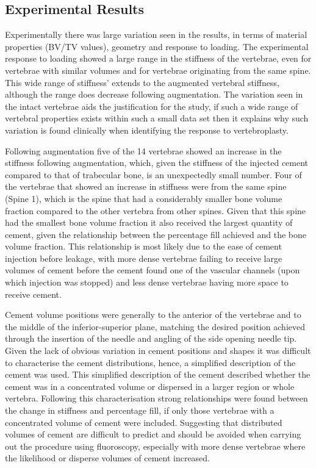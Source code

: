 \subsection{Experimental Results}

Experimentally there was large variation seen in the results, in terms of
material properties (BV/TV values), geometry and response to loading.  The
experimental response to loading showed a large range in the stiffness of the
vertebrae, even for vertebrae with similar volumes and for vertebrae
originating from the same spine.  This wide range of stiffness' extends to the
augmented vertebral stiffness, although the range does decrease following
augmentation.  The variation seen in the intact vertebrae aids the
justification for the study, if such a wide range of vertebral properties
exists within such a small data set then it explains why such variation is
found clinically when identifying the response to vertebroplasty.

Following augmentation five of the 14 vertebrae showed an increase in the
stiffness following augmentation, which, given the stiffness of the injected
cement compared to that of trabecular bone, is an unexpectedly small number.
Four of the vertebrae that showed an increase in stiffness were from the same
spine (Spine 1), which is the spine that had a considerably smaller bone volume
fraction compared to the other vertebra from other spines.  Given that this
spine had the smallest bone volume fraction it also received the largest
quantity of cement, given the relationship between the percentage fill achieved
and the bone volume fraction.  This relationship is most likely due to the ease
of cement injection before leakage, with more dense vertebrae failing to
receive large volumes of cement before the cement found one of the vascular
channels (upon which injection was stopped) and less dense vertebrae having
more space to receive cement.

Cement volume positions were generally to the anterior of the vertebrae and to
the middle of the inferior-superior plane, matching the desired position
achieved through the insertion of the needle and angling of the side opening
needle tip.  Given the lack of obvious variation in cement positions and shapes
it was difficult to characterise the cement distributions, hence, a simplified
description of the cement was used.  This simplified description of the cement
described whether the cement was in a concentrated volume or dispersed in a
larger region or whole vertebra.  Following this characterisation strong
relationships were found between the change in stiffness and percentage fill,
if only those vertebrae with a concentrated volume of cement were included.
Suggesting that distributed volumes of cement are difficult to predict and
should be avoided when carrying out the procedure using fluoroscopy, especially
with more dense vertebrae where the likelihood or disperse volumes of cement
increased.


